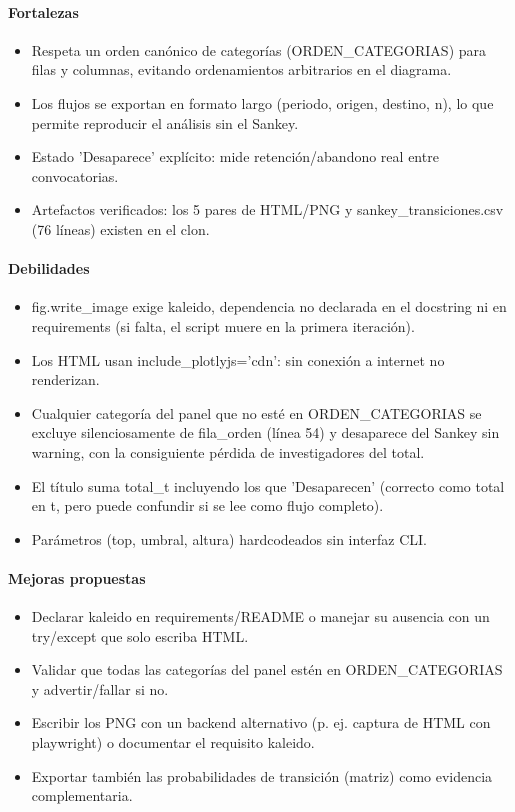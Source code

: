 \paragraph{Fortalezas}
\begin{itemize}
  \item Respeta un orden canónico de categorías (ORDEN\_CATEGORIAS) para filas y columnas, evitando ordenamientos arbitrarios en el diagrama.
  \item Los flujos se exportan en formato largo (periodo, origen, destino, n), lo que permite reproducir el análisis sin el Sankey.
  \item Estado 'Desaparece' explícito: mide retención/abandono real entre convocatorias.
  \item Artefactos verificados: los 5 pares de HTML/PNG y sankey\_transiciones.csv (76 líneas) existen en el clon.
\end{itemize}

\paragraph{Debilidades}
\begin{itemize}
  \item fig.write\_image exige kaleido, dependencia no declarada en el docstring ni en requirements (si falta, el script muere en la primera iteración).
  \item Los HTML usan include\_plotlyjs='cdn': sin conexión a internet no renderizan.
  \item Cualquier categoría del panel que no esté en ORDEN\_CATEGORIAS se excluye silenciosamente de fila\_orden (línea 54) y desaparece del Sankey sin warning, con la consiguiente pérdida de investigadores del total.
  \item El título suma total\_t incluyendo los que 'Desaparecen' (correcto como total en t, pero puede confundir si se lee como flujo completo).
  \item Parámetros (top, umbral, altura) hardcodeados sin interfaz CLI.
\end{itemize}

\paragraph{Mejoras propuestas}
\begin{itemize}
  \item Declarar kaleido en requirements/README o manejar su ausencia con un try/except que solo escriba HTML.
  \item Validar que todas las categorías del panel estén en ORDEN\_CATEGORIAS y advertir/fallar si no.
  \item Escribir los PNG con un backend alternativo (p. ej. captura de HTML con playwright) o documentar el requisito kaleido.
  \item Exportar también las probabilidades de transición (matriz) como evidencia complementaria.
\end{itemize}

